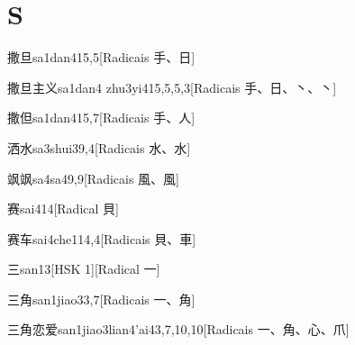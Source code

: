 
\section*{S}

\begin{entry}{撒旦}{sa1dan4}{15,5}[Radicais ⼿、⽇]
\end{entry}

\begin{entry}{撒旦主义}{sa1dan4 zhu3yi4}{15,5,5,3}[Radicais ⼿、⽇、⼂、⼂]
\end{entry}

\begin{entry}{撒但}{sa1dan4}{15,7}[Radicais ⼿、⼈]
\end{entry}

\begin{entry}{洒水}{sa3shui3}{9,4}[Radicais ⽔、⽔]
\end{entry}

\begin{entry}{飒飒}{sa4sa4}{9,9}[Radicais ⾵、⾵]
\end{entry}

\begin{entry}{赛}{sai4}{14}[Radical ⾙]
\end{entry}

\begin{entry}{赛车}{sai4che1}{14,4}[Radicais ⾙、⾞]
\end{entry}

\begin{entry}{三}{san1}{3}[HSK 1][Radical ⼀]
\end{entry}

\begin{entry}{三角}{san1jiao3}{3,7}[Radicais ⼀、⾓]
\end{entry}

\begin{entry}{三角恋爱}{san1jiao3lian4'ai4}{3,7,10,10}[Radicais ⼀、⾓、⼼、⽖]
\end{entry}

